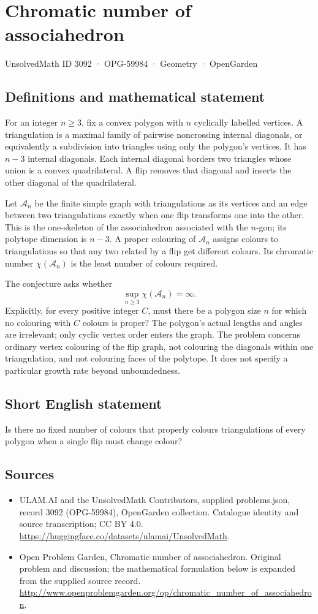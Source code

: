 \documentclass[11pt,a4paper]{article}
\begin{document}
\section*{Chromatic number of associahedron}\label{3092}
{\small UnsolvedMath ID 3092 · OPG-59984 · Geometry · OpenGarden}
\subsection{Definitions and mathematical statement}
For an integer $n\ge3$, fix a convex polygon with $n$ cyclically labelled
vertices. A triangulation is a maximal family of pairwise noncrossing
internal diagonals, or equivalently a subdivision into triangles using
only the polygon's vertices. It has $n-3$ internal diagonals.
Each internal diagonal borders two triangles whose union is a convex
quadrilateral. A flip removes that diagonal and inserts the other diagonal
of the quadrilateral.

Let $\mathcal A_n$ be the finite simple graph with triangulations as its
vertices and an edge between two triangulations exactly when one flip
transforms one into the other. This is the one-skeleton of the associahedron
associated with the $n$-gon; its polytope dimension is $n-3$.
A proper colouring of $\mathcal A_n$ assigns colours to triangulations
so that any two related by a flip get different colours. Its chromatic
number $\chi(\mathcal A_n)$ is the least number of colours required.

The conjecture asks whether
\[
 \sup_{n\ge3}\chi(\mathcal A_n)=\infty.
\]
Explicitly, for every positive integer $C$, must there be a polygon size
$n$ for which no colouring with $C$ colours is proper? The polygon's
actual lengths and angles are irrelevant; only cyclic vertex order
enters the graph. The problem concerns ordinary vertex colouring of the
flip graph, not colouring the diagonals within one triangulation, and
not colouring faces of the polytope. It does not specify a particular
growth rate beyond unboundedness.
\subsection{Short English statement}
Is there no fixed number of colours that properly colours triangulations of every polygon when a single flip must change colour?
\subsection{Sources}
\begin{itemize}
\item[S1] ULAM.AI and the UnsolvedMath Contributors, supplied problems.json, record 3092 (OPG-59984), OpenGarden collection. Catalogue identity and source transcription; CC BY 4.0.
\url{https://huggingface.co/datasets/ulamai/UnsolvedMath}.
\item[S2] Open Problem Garden, Chromatic number of associahedron. Original problem and discussion; the mathematical formulation below is expanded from the supplied source record.
\url{http://www.openproblemgarden.org/op/chromatic_number_of_associahedron}.
\end{itemize}
\end{document}
